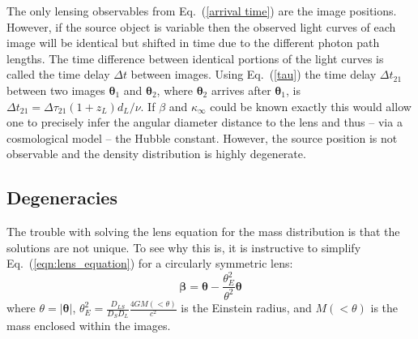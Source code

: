 \documentclass[galley,usenatbib]{mn2e}
\newcommand{\eqnref}[1] {Eq.~(\ref{#1})}
\renewcommand{\vec}[1]{\ensuremath{\boldsymbol{#1}}}
\begin{document}
The only lensing observables from \eqnref{arrival time} are the image positions. However,  if the source object is
variable then the observed light curves of each image will be
identical but shifted in time due to the different photon path lengths.
The time difference between identical portions of the light curves is called
the time delay $\Delta t$ between images.  Using \eqnref{tau} the time delay
$\Delta t_{21}$ between two images $\vec\theta_1$ and $\vec\theta_2$, where $\vec\theta_2$
arrives after $\vec\theta_1$, is $\Delta t_{21} = \Delta \tau_{21}(1+z_L)d_L /
\nu$. If $\beta$ and $\kappa_\infty$ could be known exactly this would allow one
to precisely infer the angular diameter distance to the lens and thus -- via a cosmological model -- the Hubble constant. However, the source position is not
observable and the density distribution is highly degenerate.

\subsection{Degeneracies}\label{sec:degen} %

The trouble with solving the lens equation for the mass distribution is that the solutions are not unique. To see why this is, it is instructive to simplify \eqnref{eqn:lens_equation} for a circularly symmetric lens: 
%
\begin{equation}
\vec\beta = \vec\theta - \frac{\theta_E^2}{\theta^2}\vec\theta
\label{eqn:lens_equation_circ}
\end{equation}
%
where $\theta = |\vec\theta|$, $\theta_E^2 = \frac{D_{LS}}{D_S D_L} \frac{4 GM(<\theta)}{c^2}$ is the Einstein radius, and $M(<\theta)$ is the mass enclosed within the images. 
\end{document}
